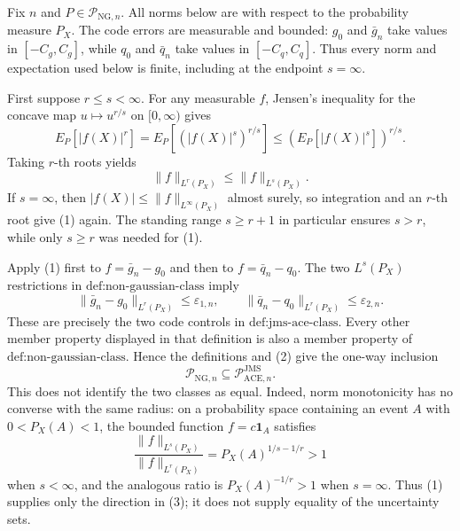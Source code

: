 Fix \(n\) and \(P\in\mathcal P_{\mathrm{NG},n}\).  All norms below are
with respect to the probability measure \(P_X\).  The code errors are
measurable and bounded: \(g_0\) and \(\bar g_n\) take values in
\([-C_g,C_g]\), while \(q_0\) and \(\bar q_n\) take values in
\([-C_q,C_q]\).  Thus every norm and expectation used below is finite,
including at the endpoint \(s=\infty\).

First suppose \(r\le s<\infty\).  For any measurable \(f\), Jensen's
inequality for the concave map \(u\mapsto u^{r/s}\) on
\([0,\infty)\) gives
\[
 E_P[|f(X)|^r]
 =E_P\!\left[(|f(X)|^s)^{r/s}\right]
 \le \left(E_P[|f(X)|^s]\right)^{r/s}.
\]
Taking \(r\)-th roots yields
\[
 \|f\|_{L^r(P_X)}\le \|f\|_{L^s(P_X)}.                 \tag{1}
\]
If \(s=\infty\), then \(|f(X)|\le\|f\|_{L^\infty(P_X)}\)
almost surely, so integration and an \(r\)-th root give (1) again.
The standing range \(s\ge r+1\) in particular ensures \(s>r\), while
only \(s\ge r\) was needed for (1).

Apply (1) first to \(f=\bar g_n-g_0\) and then to
\(f=\bar q_n-q_0\).  The two \(L^s(P_X)\) restrictions in
\(\text{def:non-gaussian-class}\) imply
\[
 \|\bar g_n-g_0\|_{L^r(P_X)}\le\varepsilon_{1,n},
 \qquad
 \|\bar q_n-q_0\|_{L^r(P_X)}\le\varepsilon_{2,n}.       \tag{2}
\]
These are precisely the two code controls in
\(\text{def:jms-ace-class}\).  Every other member property displayed
in that definition is also a member property of
\(\text{def:non-gaussian-class}\).  Hence the definitions and (2) give
the one-way inclusion
\[
 \mathcal P_{\mathrm{NG},n}
 \subseteq \mathcal P_{\mathrm{ACE},n}^{\mathrm{JMS}}.   \tag{3}
\]
This does not identify the two classes as equal.  Indeed, norm
monotonicity has no converse with the same radius: on a probability
space containing an event \(A\) with \(0<P_X(A)<1\), the bounded
function \(f=c\mathbf 1_A\) satisfies
\[
 \frac{\|f\|_{L^s(P_X)}}{\|f\|_{L^r(P_X)}}
 =P_X(A)^{1/s-1/r}>1
\]
when \(s<\infty\), and the analogous ratio is
\(P_X(A)^{-1/r}>1\) when \(s=\infty\).  Thus (1) supplies only the
direction in (3); it does not supply equality of the uncertainty sets.

